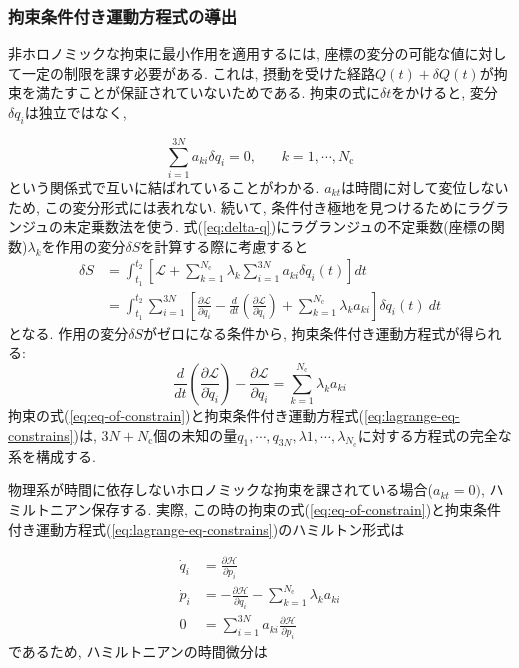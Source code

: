 \subsubsection{拘束条件付き運動方程式の導出}
非ホロノミックな拘束に最小作用を適用するには, 座標の変分の可能な値に対して一定の制限を課す必要がある. これは, 摂動を受けた経路$Q(t) + \delta Q(t)$が拘束を満たすことが保証されていないためである. 
拘束の式に$\delta t$をかけると, 変分$\delta q_{i}$は独立ではなく, 

\begin{equation}
  \sum_{i = 1}^{3N} a_{ki} \delta q_{i} = 0, ~~~~~~~~ k = 1,\cdots, N_{\mathrm{c}}
  \label{eq:delta-q}
\end{equation}
という関係式で互いに結ばれていることがわかる. 
$a_{kt}$は時間に対して変位しないため, この変分形式には表れない. 
続いて, 条件付き極地を見つけるためにラグランジュの未定乗数法を使う. 
式(\ref{eq:delta-q})にラグランジュの不定乗数(座標の関数)$\lambda_{k}$を作用の変分$\delta S$を計算する際に考慮すると
\begin{align}
  \delta S
  &=
  \int_{t_1}^{t_2}
  \left[ \mathcal{L} +
         \sum_{k=1}^{N_{\mathrm{c}}}
         \lambda_{k} \sum_{i = 1}^{3N} a_{ki} \delta q_{i}(t)
  \right] dt
  \\
  &=
  \int_{t_1}^{t_2}
  \sum_{i=1}^{3N}
  \left[
         \frac{\partial \mathcal{L}}{\partial q_{i}}
       - \frac{d}{dt} \left( \frac{\partial \mathcal{L}}{\partial \dot{q}_{i}}\right)
       + \sum_{k=1}^{N_{\mathrm{c}}} \lambda_{k} a_{ki}
  \right] \delta q_{i}(t) ~dt
\end{align}
となる. 作用の変分$\delta S$がゼロになる条件から, 拘束条件付き運動方程式が得られる:
\begin{equation}
  \frac{d}{dt} \left( \frac{\partial \mathcal{L}}{\partial \dot{q}_{i}}\right)
 -\frac{\partial \mathcal{L}}{\partial q_{i}}
 =
 \sum_{k=1}^{N_{\mathrm{c}}} \lambda_{k} a_{ki}
\label{eq:lagrange-eq-constrains}
\end{equation}
拘束の式(\ref{eq:eq-of-constrain})と拘束条件付き運動方程式(\ref{eq:lagrange-eq-constrains})は, $3N+N_{\mathrm{c}}$個の未知の量$q_{1},\cdots,q_{3N}, \lambda{1}, \cdots, \lambda_{N_{\mathrm{c}}}$に対する方程式の完全な系を構成する. 

物理系が時間に依存しないホロノミックな拘束を課されている場合($a_{kt} = 0)$, ハミルトニアン保存する. 実際, この時の拘束の式(\ref{eq:eq-of-constrain})と拘束条件付き運動方程式(\ref{eq:lagrange-eq-constrains})のハミルトン形式は

\begin{align}
  \dot{q}_{i} &=  \frac{\partial \mathcal{H}}{\partial p_{i}}
  \\
  \dot{p}_{i} &= -\frac{\partial \mathcal{H}}{\partial q_{i}}
                 -\sum_{k=1}^{N_{\mathrm{c}}} \lambda_{k} a_{ki}
  \\
  0 &= \sum_{i=1}^{3N} a_{ki} \frac{\partial \mathcal{H}}{\partial p_{i}}
\end{align}
であるため, ハミルトニアンの時間微分は

